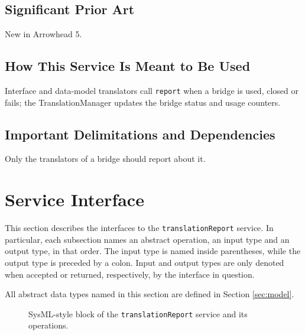 \documentclass[a4paper]{arrowhead}
\begin{document}
\subsection{Significant Prior Art}

New in Arrowhead 5.

\subsection{How This Service Is Meant to Be Used}

Interface and data-model translators call \texttt{report} when a bridge is used, closed or fails; the Translation\allowbreak{}Manager updates the bridge status and usage counters.

\subsection{Important Delimitations and Dependencies}
\label{sec:delimitations}

Only the translators of a bridge should report about it.

\newpage

\section{Service Interface}
\label{sec:operations}

This section describes the interfaces to the \texttt{translationReport} service.
In particular, each subsection names an abstract operation, an input type and an output type, in that order.
The input type is named inside parentheses, while the output type is preceded by a colon.
Input and output types are only denoted when accepted or returned, respectively, by the interface in question.

All abstract data types named in this section are defined in Section \ref{sec:model}.

\begin{figure}[ht!]
  \centering
  \caption{SysML-style block of the \texttt{translationReport} service and its operations.}
  \label{fig:SD}
\end{figure}
\end{document}
